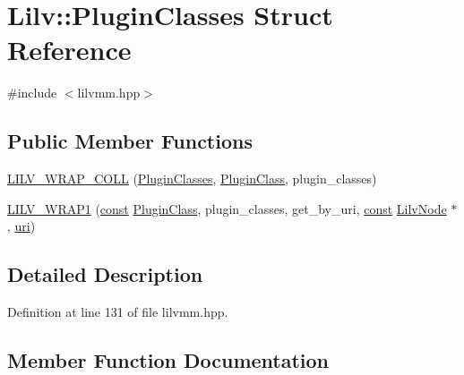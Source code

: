 \hypertarget{struct_lilv_1_1_plugin_classes}{}\section{Lilv\+:\+:Plugin\+Classes Struct Reference}
\label{struct_lilv_1_1_plugin_classes}


{\ttfamily \#include $<$lilvmm.\+hpp$>$}

\subsection*{Public Member Functions}
\begin{DoxyCompactItemize}
\item 
\hyperlink{struct_lilv_1_1_plugin_classes_a545c016d6677fe16783e063b75bd19b5}{L\+I\+L\+V\+\_\+\+W\+R\+A\+P\+\_\+\+C\+O\+LL} (\hyperlink{struct_lilv_1_1_plugin_classes}{Plugin\+Classes}, \hyperlink{struct_lilv_1_1_plugin_class}{Plugin\+Class}, plugin\+\_\+classes)
\item 
\hyperlink{struct_lilv_1_1_plugin_classes_ad32a4c2044f1fb74b4c2d2b6c98f2dc8}{L\+I\+L\+V\+\_\+\+W\+R\+A\+P1} (\hyperlink{getopt1_8c_a2c212835823e3c54a8ab6d95c652660e}{const} \hyperlink{struct_lilv_1_1_plugin_class}{Plugin\+Class}, plugin\+\_\+classes, get\+\_\+by\+\_\+uri, \hyperlink{getopt1_8c_a2c212835823e3c54a8ab6d95c652660e}{const} \hyperlink{lilv_8h_ae183dca3dca5368d34dbd863a405437b}{Lilv\+Node} $\ast$, \hyperlink{lib_2expat_8h_a5a9fdd6c2606370ad12f24c078ac6585}{uri})
\end{DoxyCompactItemize}


\subsection{Detailed Description}


Definition at line 131 of file lilvmm.\+hpp.



\subsection{Member Function Documentation}
